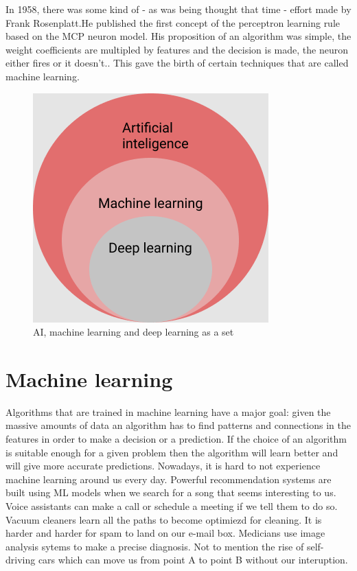 \documentclass[a4paper,oneside,openright,11pt]{book}
\begin{document}
In 1958, there was some kind of - as was being thought that time -  effort made by Frank Rosenplatt.He published the first concept of the perceptron learning rule based on the MCP neuron model. His proposition of an algorithm was simple, the weight coefficients are multipled by features and the decision is made, the neuron either fires or it doesn't.\cite{raschka}. This gave the birth of certain techniques that are called machine learning.


\begin{figure}[h!]
\centering
\includegraphics[scale=0.5]{DocumentFigures/MyFigures/zbiorki.png}
\caption{AI, machine learning and deep learning as a set}
\end{figure}



\section{Machine learning}

Algorithms that are trained in machine learning have a major goal: given the massive amounts of data an algorithm has to find patterns and connections in the features in order to make a decision or a prediction. If the choice of an algorithm is suitable enough for a given problem then the algorithm will learn better and will give more accurate predictions. Nowadays, it is hard to not experience machine learning around us every day. Powerful recommendation systems are built using ML models when we search for a song that seems interesting to us. Voice assistants can make a call or schedule a meeting if we tell them to do so. Vacuum cleaners learn all the paths to become optimiezd for cleaning. It is harder and harder for spam to land on our e-mail box. Medicians use image analysis sytems to make a precise diagnosis. Not to mention the rise of self-driving cars which can move us from point A to point B without our interuption. 
\end{document}
